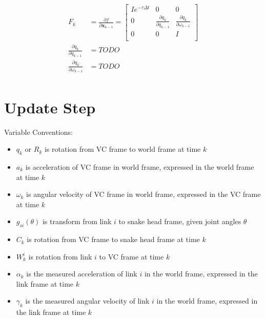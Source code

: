 \documentclass[11pt]{article}
\newcommand{\pd}[2]{\frac{\partial #1}{\partial #2}} %
\begin{document}
\begin{align*}
    F_k &= \pd{f}{\mathbf{x}_{k-1}} = \begin{bmatrix}
        Ie^{-\tau \Delta t} & 0 & 0 \\
        0 & \pd{q_k}{q_{k-1}} & \pd{q_k}{\omega_{k-1}} \\
        0 & 0 & I \\
    \end{bmatrix} \\
    \pd{q_k}{q_{k-1}} &= TODO \\
    \pd{q_k}{\omega_{k-1}} &= TODO \\
\end{align*}

\section{Update Step}
Variable Conventions:
\begin{itemize}
    \item $q_k$ or $R_k$ is rotation from VC frame to world frame at time $k$
    \item $a_k$ is acceleration of VC frame in world frame, expressed in the world frame at time $k$
    \item $\omega_k$ is angular velocity of VC frame in world frame, expressed in the VC frame at time $k$
    \item $g_{si}(\theta)$ is transform from link $i$ to snake head frame, given joint angles $\theta$
    \item $C_k$ is rotation from VC frame to snake head frame at time $k$
    \item $W_k^i$ is rotation from link $i$ to VC frame at time $k$
    \item $\alpha_k$ is the measured acceleration of link $i$ in the world frame, expressed in the link frame at time $k$
    \item $\gamma_k$ is the measured angular velocity of link $i$ in the world frame, expressed in the link frame at time $k$
\end{itemize} 
\end{document}
